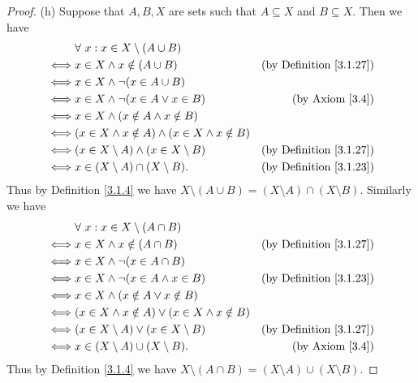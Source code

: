 \begin{proof}{(h)}
    Suppose that \(A, B, X\) are sets such that \(A \subseteq X\) and \(B \subseteq X\).
    Then we have
    \begin{align*}
             & \forall\ x : x \in X \setminus (A \cup B)                                                         \\
        \iff & x \in X \land x \notin (A \cup B)                           & \text{(by Definition \ref{3.1.27})} \\
        \iff & x \in X \land \lnot (x \in A \cup B)                                                              \\
        \iff & x \in X \land \lnot (x \in A \lor x \in B)                  & \text{(by Axiom \ref{3.4})}         \\
        \iff & x \in X \land (x \notin A \land x \notin B)                                                       \\
        \iff & (x \in X \land x \notin A) \land (x \in X \land x \notin B)                                       \\
        \iff & (x \in X \setminus A) \land (x \in X \setminus B)           & \text{(by Definition \ref{3.1.27})} \\
        \iff & x \in (X \setminus A) \cap (X \setminus B).                 & \text{(by Definition \ref{3.1.23})}
    \end{align*}
    Thus by Definition \ref{3.1.4} we have \(X \setminus (A \cup B) = (X \setminus A) \cap (X \setminus B)\).
    Similarly we have
    \begin{align*}
             & \forall\ x : x \in X \setminus (A \cap B)                                                        \\
        \iff & x \in X \land x \notin (A \cap B)                          & \text{(by Definition \ref{3.1.27})} \\
        \iff & x \in X \land \lnot (x \in A \cap B)                                                             \\
        \iff & x \in X \land \lnot (x \in A \land x \in B)                & \text{(by Definition \ref{3.1.23})} \\
        \iff & x \in X \land (x \notin A \lor x \notin B)                                                       \\
        \iff & (x \in X \land x \notin A) \lor (x \in X \land x \notin B)                                       \\
        \iff & (x \in X \setminus A) \lor (x \in X \setminus B)           & \text{(by Definition \ref{3.1.27})} \\
        \iff & x \in (X \setminus A) \cup (X \setminus B).                & \text{(by Axiom \ref{3.4})}
    \end{align*}
    Thus by Definition \ref{3.1.4} we have \(X \setminus (A \cap B) = (X \setminus A) \cup (X \setminus B)\).
\end{proof}

